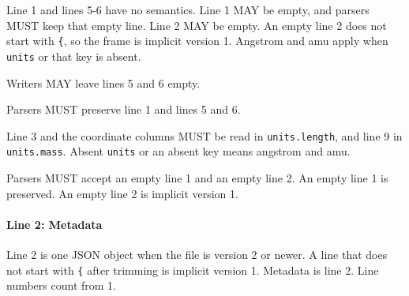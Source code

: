 Line 1 and lines 5-6 have no semantics. Line 1 MAY be empty, and parsers
MUST keep that empty line. Line 2 MAY be empty. An empty line 2 does not
start with \texttt{\{}, so the frame is implicit version 1. Angstrom and
amu apply when \texttt{units} or that key is absent.

\begin{description}
\tightlist
\item[CON-header.1 (MAY)] Writers MAY leave lines 5 and 6 empty.
\item[CON-header.2 (MUST)] Parsers MUST preserve line 1 and lines 5 and 6.
\item[CON-header.3 (MUST)] Line 3 and the coordinate columns MUST be read in
\texttt{units.length}, and line 9 in \texttt{units.mass}. Absent
\texttt{units} or an absent key means angstrom and amu.
\item[CON-header.4 (MUST)] Parsers MUST accept an empty line 1 and an empty line 2. An
empty line 1 is preserved. An empty line 2 is implicit version 1.
\end{description}

\paragraph{Line 2: Metadata}\label{spec:metadata}

Line 2 is one JSON object when the file is version 2 or newer. A line
that does not start with \texttt{\{} after trimming is implicit version
1. Metadata is line 2. Line numbers count from 1.

